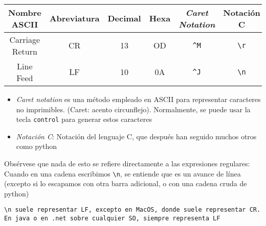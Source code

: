 \documentclass[ucs]{beamer}
\begin{document}
\begin{frame}[fragile]
\frametitle{}

\begin{scriptsize}
 \begin{tabular}{|c|c|c|c|c|c|}

\hline
\bf{Nombre ASCII} & \bf{Abreviatura} & \bf{Decimal} & \bf{Hexa} & \bf{\emph{Caret Notation}} & \bf{Notación C} \\

\hline
\hline
Carriage Return &  CR & 13 & OD & \verb|^M| & \verb|\r| \\ 
\hline
Line Feed       &  LF & 10 & 0A & \verb|^J| & \verb|\n| \\ 
\hline
  \end{tabular}
\end{scriptsize}

\begin{itemize}
\item
\emph{Caret notation} es una método empleado en ASCII para representar
caracteres no imprimibles. (Caret: acento circunflejo). Normalmente,
se puede usar la tecla \verb|control| para generar estos
caracteres
\item
\emph{Notación C}: Notación del lenguaje C, que después han
seguido muchos otros como python
\end{itemize}

Obsérvese que nada de esto se refiere directamente
a las expresiones regulares: Cuando en una cadena escribimos
\verb|\n|, se entiende que es un avance de línea (excepto
si lo escapamos con otra barra adicional, o con una
cadena cruda de python)

  \begin{tiny}
  \begin{verbatim}
\n suele representar LF, excepto en MacOS, donde suele representar CR. 
En java o en .net sobre cualquier SO, siempre representa LF
  \end{verbatim}
  \end{tiny}



\end{frame}
\end{document}

